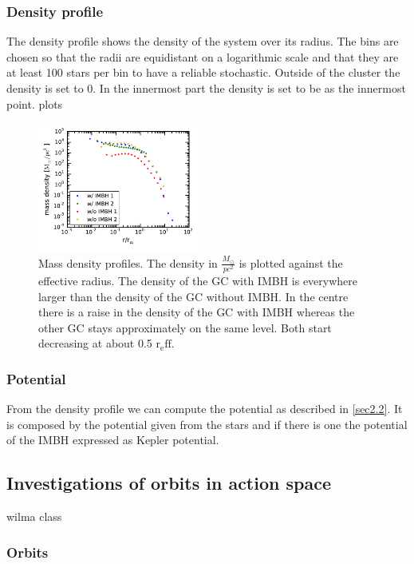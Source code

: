 \documentclass[a4paper,12pt,abstracton]{scrartcl}
\begin{document}
\subsubsection{Density profile}
The density profile shows the density of the system over its radius. The bins are chosen so that the radii are equidistant on a logarithmic scale and that they are at least 100 stars per bin to have a reliable stochastic. Outside of the cluster the density is set to 0. In the innermost part the density is set to be as the innermost point.
plots\\
\begin{figure}
\centering
\includegraphics[width=0.475\textwidth]{Plots/density_profiles.pdf}
\caption{Mass density profiles. The density in \(\frac{M_{\odot}}{pc^2}\) is plotted against the effective radius. The density of the \ac{GC} with \ac{IMBH} is everywhere larger than the density of the \ac{GC} without \ac{IMBH}. In the centre there is a raise in the density of the \ac{GC} with \ac{IMBH} whereas the other \ac{GC} stays approximately on the same level. Both start decreasing at about 0.5 \(\mathrm{r_eff}\).}
\label{fig:mass_density_profile}
\end{figure}

\subsubsection{Potential}
From the density profile we can compute the potential as described in \ref{sec2.2}. It is composed by the potential given from the stars and if there is one the potential of the \ac{IMBH} expressed as Kepler potential.


\subsection{Investigations of orbits in action space}
wilma class 
\subsubsection{Orbits}
\end{document}
